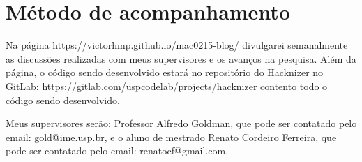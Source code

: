 \documentclass[10pt,twoside,a4paper]{article}
\begin{document}
\section{Método de acompanhamento}

    Na página https://victorhmp.github.io/mac0215-blog/ divulgarei semanalmente as discussões realizadas com meus supervisores e os avanços na pesquisa. Além da página, o código sendo desenvolvido estará no repositório do Hacknizer no GitLab: https://gitlab.com/uspcodelab/projects/hacknizer contento todo o código sendo desenvolvido.
    
    Meus supervisores serão: Professor Alfredo Goldman, que pode ser contatado pelo email: gold@ime.usp.br, e o aluno de mestrado Renato Cordeiro Ferreira, que pode ser contatado pelo email: renatocf@gmail.com.




\end{document}
